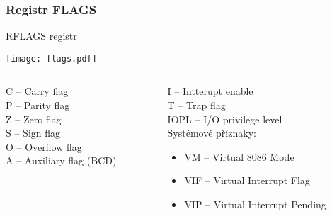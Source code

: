 \documentclass{beamer}
\begin{document}
\begin{frame}
\frametitle{Registr FLAGS}
RFLAGS registr
\begin{center}
\texttt{[image: flags.pdf]}
\end{center}
\begin{columns}[t,onlytextwidth]
\begin{column}{0.5\textwidth}
C -- Carry flag\\
P -- Parity flag\\
Z -- Zero flag\\
S -- Sign flag\\
O -- Overflow flag\\
A -- Auxiliary flag (BCD)
\end{column}
\begin{column}{0.5\textwidth}  
I -- Intterupt enable\\
T -- Trap flag\\
IOPL -- I/O privilege level\\
Systémové příznaky:
\begin{itemize}
\item VM -- Virtual 8086 Mode
\item VIF -- Virtual Interrupt Flag
\item VIP -- Virtual Interrupt Pending
\end{itemize}
\end{column}
\end{columns}
\end{frame}
\end{document}
